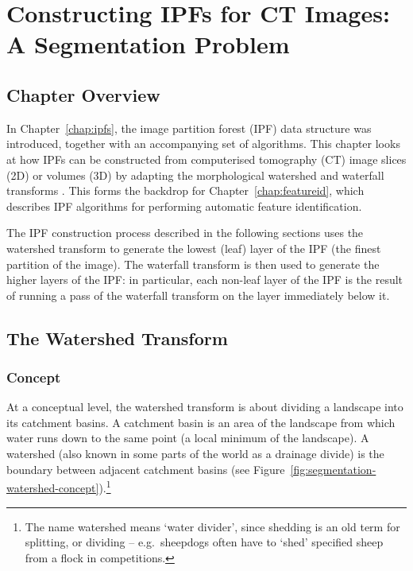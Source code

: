 \chapter[Constructing IPFs for CT Images: A Segmentation Problem]{Constructing IPFs for CT Images:\\A Segmentation Problem}
\label{chap:segmentation}

\section{Chapter Overview}

In Chapter~\ref{chap:ipfs}, the image partition forest (IPF) data structure was introduced, together with an accompanying set of algorithms. This chapter looks at how IPFs can be constructed from computerised tomography (CT) image slices (2D) or volumes (3D) by adapting the morphological watershed and waterfall transforms \cite{beucher94,marcotegui05}. This forms the backdrop for Chapter~\ref{chap:featureid}, which describes IPF algorithms for performing automatic feature identification.

The IPF construction process described in the following sections uses the watershed transform to generate the lowest (leaf) layer of the IPF (the finest partition of the image). The waterfall transform is then used to generate the higher layers of the IPF: in particular, each non-leaf layer of the IPF is the result of running a pass of the waterfall transform on the layer immediately below it.

\section{The Watershed Transform}

\subsection{Concept}

At a conceptual level, the watershed transform is about dividing a landscape into its catchment basins. A catchment basin is an area of the landscape from which water runs down to the same point (a local minimum of the landscape). A watershed (also known in some parts of the world as a drainage divide) is the boundary between adjacent catchment basins (see Figure~\ref{fig:segmentation-watershed-concept}).\footnote{The name watershed means `water divider', since shedding is an old term for splitting, or dividing -- e.g.~sheepdogs often have to `shed' specified sheep from a flock in competitions.}


